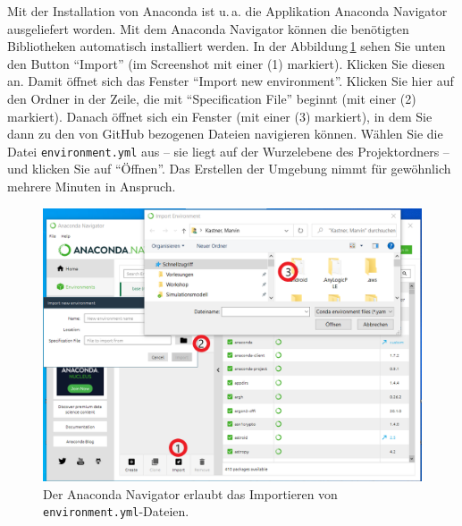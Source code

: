 \documentclass{tufte-handout}
\begin{document}
Mit der Installation von Anaconda ist u.\,a. die Applikation Anaconda Navigator ausgeliefert worden.
Mit dem Anaconda Navigator können die benötigten Bibliotheken automatisch installiert werden.
In der Abbildung\,\ref{fig:anaconda-navigator} sehen Sie unten den Button \enquote{Import} (im Screenshot mit einer (1) markiert).
Klicken Sie diesen an.
Damit öffnet sich das Fenster \enquote{Import new environment}.
Klicken Sie hier auf den Ordner in der Zeile, die mit 
\enquote{Specification File}
beginnt (mit einer (2) markiert).
Danach öffnet sich ein Fenster (mit einer (3) markiert), in dem Sie dann zu den von GitHub bezogenen Dateien navigieren können.
Wählen Sie die Datei \texttt{environment.yml} aus
-- sie liegt auf der Wurzelebene des Projektordners --
und klicken Sie auf \enquote{Öffnen}.
Das Erstellen der Umgebung nimmt für gewöhnlich mehrere Minuten in Anspruch.

\begin{figure}[h]
  \includegraphics{anaconda-navigator-import-new-environment--mit-reihenfolge}
  \caption{Der Anaconda Navigator erlaubt das Importieren von \texttt{environment.yml}-Dateien.}%
\label{fig:anaconda-navigator}
\end{figure}
\end{document}
